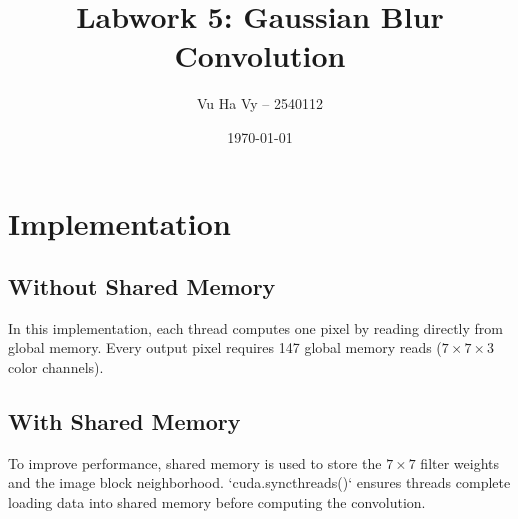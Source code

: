 \documentclass{article}
\title{Labwork 5: Gaussian Blur Convolution}
\author{Vu Ha Vy -- 2540112 \\}
\date{\today}
\begin{document}
\maketitle

\section{Implementation}

\subsection{Without Shared Memory}

In this implementation, each thread computes one pixel by reading directly from global memory. Every output pixel requires 147 global memory reads ($7 \times 7 \times 3$ color channels).

\subsection{With Shared Memory}

To improve performance, shared memory is used to store the $7 \times 7$ filter weights and the image block neighborhood. `cuda.syncthreads()` ensures threads complete loading data into shared memory before computing the convolution. \\
\end{document}
